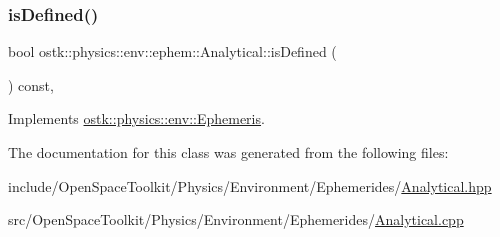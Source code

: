 \subsubsection{\texorpdfstring{is\+Defined()}{isDefined()}}
{\footnotesize\ttfamily bool ostk\+::physics\+::env\+::ephem\+::\+Analytical\+::is\+Defined (\begin{DoxyParamCaption}{ }\end{DoxyParamCaption}) const\hspace{0.3cm}{\ttfamily [override]}, {\ttfamily [virtual]}}



Implements \hyperlink{classostk_1_1physics_1_1env_1_1_ephemeris_ace5a637a5f25f700dfe1a2cef2b08162}{ostk\+::physics\+::env\+::\+Ephemeris}.



The documentation for this class was generated from the following files\+:\begin{DoxyCompactItemize}
\item 
include/\+Open\+Space\+Toolkit/\+Physics/\+Environment/\+Ephemerides/\hyperlink{_analytical_8hpp}{Analytical.\+hpp}\item 
src/\+Open\+Space\+Toolkit/\+Physics/\+Environment/\+Ephemerides/\hyperlink{_analytical_8cpp}{Analytical.\+cpp}\end{DoxyCompactItemize}
